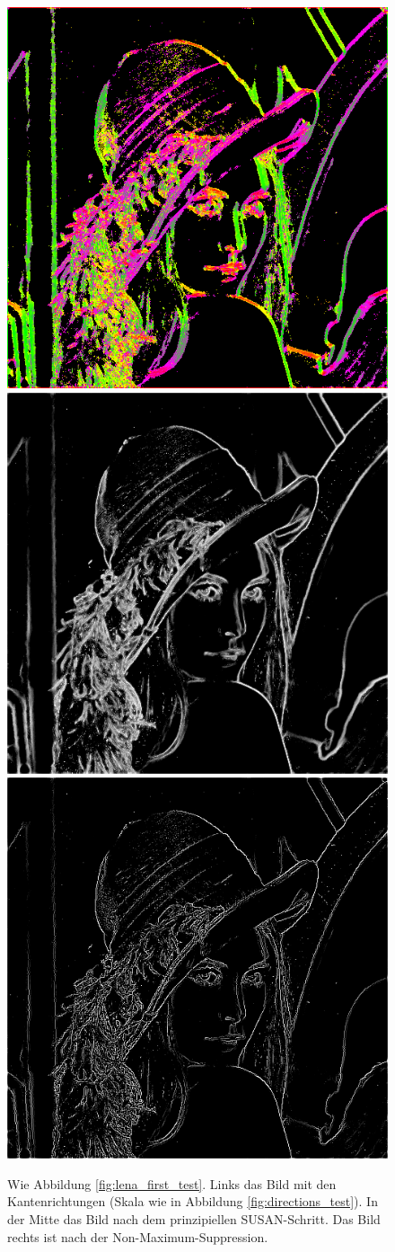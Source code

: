\documentclass[a4paper, 11pt]{report}
\theoremstyle{definition}
\begin{document}
			\begin{figure}[H]\centering
				\includegraphics[width=.3\textwidth]{../examples/lena/15_out_heat.png}\quad
				\includegraphics[width=.3\textwidth]{../examples/lena/15_out_raw.png}\quad
				\includegraphics[width=.3\textwidth]{../examples/lena/15_out_nonmax_supp.png}

				\caption{Wie Abbildung \ref{fig:lena_first_test}. Links das Bild mit den Kantenrichtungen (Skala wie in Abbildung \ref{fig:directions_test}). In der Mitte das Bild nach dem prinzipiellen SUSAN-Schritt. Das Bild rechts ist nach der Non-Maximum-Suppression.}
				\label{fig:lena_nonmax_supp}
			\end{figure}
\end{document}
